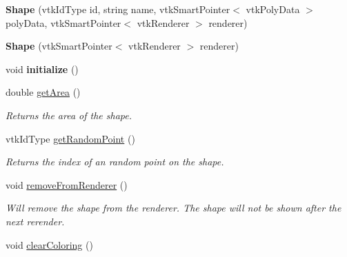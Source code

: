 \begin{DoxyCompactItemize}
\item 
\hypertarget{class_shape_aab6c4ff20fa49b8b385b419920d0120b}{}{\bfseries Shape} (vtk\+Id\+Type id, string name, vtk\+Smart\+Pointer$<$ vtk\+Poly\+Data $>$ poly\+Data, vtk\+Smart\+Pointer$<$ vtk\+Renderer $>$ renderer)\label{class_shape_aab6c4ff20fa49b8b385b419920d0120b}

\item 
\hypertarget{class_shape_a33b544996799b9913c84078d72bee332}{}{\bfseries Shape} (vtk\+Smart\+Pointer$<$ vtk\+Renderer $>$ renderer)\label{class_shape_a33b544996799b9913c84078d72bee332}

\item 
\hypertarget{class_shape_a189e5a234a7fb4a8888c6bc7bbb040ff}{}void {\bfseries initialize} ()\label{class_shape_a189e5a234a7fb4a8888c6bc7bbb040ff}

\item 
double \hyperlink{class_shape_a24c101a3184c78884e8bf28a90d410c8}{get\+Area} ()
\begin{DoxyCompactList}\small\item\em Returns the area of the shape. \end{DoxyCompactList}\item 
\hypertarget{class_shape_a0818ab153b73b62e9ffe79303c10eb18}{}vtk\+Id\+Type \hyperlink{class_shape_a0818ab153b73b62e9ffe79303c10eb18}{get\+Random\+Point} ()\label{class_shape_a0818ab153b73b62e9ffe79303c10eb18}

\begin{DoxyCompactList}\small\item\em Returns the index of an random point on the shape. \end{DoxyCompactList}\item 
\hypertarget{class_shape_a7f9810d48aa814bd5af8d536cc0d6a30}{}void \hyperlink{class_shape_a7f9810d48aa814bd5af8d536cc0d6a30}{remove\+From\+Renderer} ()\label{class_shape_a7f9810d48aa814bd5af8d536cc0d6a30}

\begin{DoxyCompactList}\small\item\em Will remove the shape from the renderer. The shape will not be shown after the next rerender. \end{DoxyCompactList}\item 
\hypertarget{class_shape_a1face9516d3e6bebf44c2014bbdfe19f}{}void \hyperlink{class_shape_a1face9516d3e6bebf44c2014bbdfe19f}{clear\+Coloring} ()\label{class_shape_a1face9516d3e6bebf44c2014bbdfe19f}


\end{DoxyCompactItemize}
